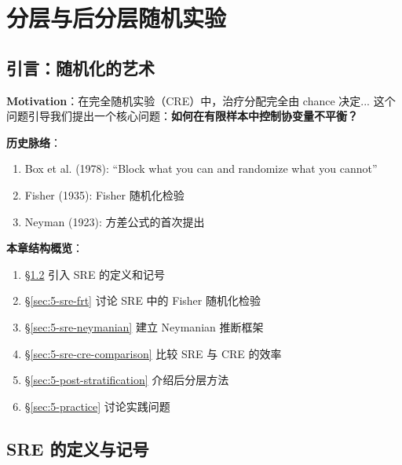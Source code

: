 
\chapter{分层与后分层随机实验}\label{ch:5}

\section{引言：随机化的艺术}\label{sec:5-intro}

\textbf{Motivation}：在完全随机实验（CRE）中，治疗分配完全由 chance 决定...
这个问题引导我们提出一个核心问题：\textbf{如何在有限样本中控制协变量不平衡？}

\textbf{历史脉络}：
\begin{enumerate}
\item Box et al. (1978): ``Block what you can and randomize what you cannot''
\item Fisher (1935): Fisher 随机化检验
\item Neyman (1923): 方差公式的首次提出
\end{enumerate}

\textbf{本章结构概览}：
\begin{enumerate}
\item \S\ref{sec:5-sre-definition} 引入 SRE 的定义和记号
\item \S\ref{sec:5-sre-frt} 讨论 SRE 中的 Fisher 随机化检验
\item \S\ref{sec:5-sre-neymanian} 建立 Neymanian 推断框架
\item \S\ref{sec:5-sre-cre-comparison} 比较 SRE 与 CRE 的效率
\item \S\ref{sec:5-post-stratification} 介绍后分层方法
\item \S\ref{sec:5-practice} 讨论实践问题
\end{enumerate}

\section{SRE 的定义与记号}\label{sec:5-sre-definition}

